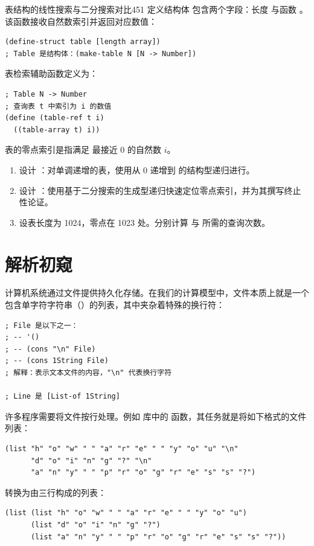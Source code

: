 \begin{exercise}{表结构的线性搜索与二分搜索对比}{451}\label{ex:451}
定义结构体  包含两个字段：长度  与函数 。该函数接收自然数索引并返回对应数值：
\begin{lstlisting}[language=BSL]
(define-struct table [length array])
; Table 是结构体：(make-table N [N -> Number])
\end{lstlisting}
表检索辅助函数定义为：
\begin{lstlisting}[language=BSL]
; Table N -> Number
; 查询表 t 中索引为 i 的数值
(define (table-ref t i)
  ((table-array t) i))
\end{lstlisting}
表的零点索引是指满足  最接近 0 的自然数 $i$。
\begin{enumerate}
  \item 设计 ：对单调递增的表，使用从 0 递增到  的结构型递归进行。
  \item 设计 ：使用基于二分搜索的生成型递归快速定位零点索引，并为其撰写终止性论证。
  \item 设表长度为 1024，零点在 1023 处。分别计算  与  所需的查询次数。
\end{enumerate}
\end{exercise}

\section{解析初窥}
\label{sec:27_3}

计算机系统通过文件提供持久化存储。在我们的计算模型中，文件本质上就是一个包含单字符字符串（）的列表，其中夹杂着特殊的换行符：

\begin{lstlisting}[language=BSL]
; File 是以下之一：
; -- '()
; -- (cons "\n" File)
; -- (cons 1String File)
; 解释：表示文本文件的内容，"\n" 代表换行字符

; Line 是 [List-of 1String]
\end{lstlisting}

许多程序需要将文件按行处理。例如  库中的  函数，其任务就是将如下格式的文件列表：
\begin{lstlisting}[language=BSL]
(list "h" "o" "w" " " "a" "r" "e" " " "y" "o" "u" "\n"
      "d" "o" "i" "n" "g" "?" "\n"
      "a" "n" "y" " " "p" "r" "o" "g" "r" "e" "s" "s" "?")
\end{lstlisting}
转换为由三行构成的列表：
\begin{lstlisting}[language=BSL]
(list (list "h" "o" "w" " " "a" "r" "e" " " "y" "o" "u")
      (list "d" "o" "i" "n" "g" "?")
      (list "a" "n" "y" " " "p" "r" "o" "g" "r" "e" "s" "s" "?"))
\end{lstlisting}

